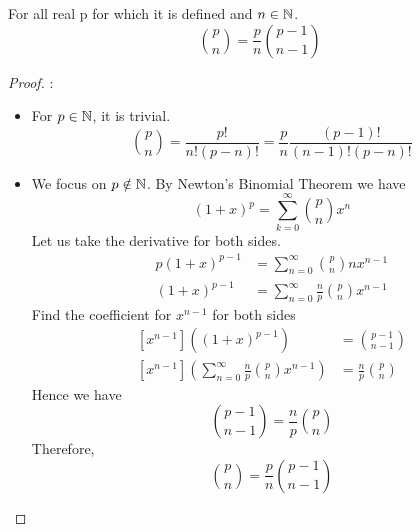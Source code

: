 \begin{lemma}
    For all real p for which it is defined and $n \in \mathbb{N}$.
    $${p \choose n}=\frac{p}{n}{p-1 \choose n-1}$$
\end{lemma}
\begin{proof}:
    \begin{itemize}
        \item For $p \in \mathbb{N}$, it is trivial. $${p \choose n}=\frac{p!}{n!(p-n)!}=\frac{p}{n}\frac{(p-1)!}{(n-1)!(p-n)!}$$
        \item We focus on $p \notin \mathbb{N}$. By Newton's Binomial Theorem we have $$(1+x)^p=\sum_{k=0}^{\infty}{p \choose n}x^n$$
        Let us take the derivative for both sides.
        \begin{equation}
            \begin{split}
                p(1+x)^{p-1} &= \sum_{n=0}^{\infty}{p \choose n}nx^{n-1}\\
                (1+x)^{p-1} &= \sum_{n=0}^{\infty}\frac{n}{p}{p \choose n}x^{n-1}
            \end{split}
        \end{equation}
        Find the coefficient for $x^{n-1}$ for both sides
        \begin{equation}
            \begin{split}
                [x^{n-1}]((1+x)^{p-1}) &= {p-1 \choose n-1}\\
                [x^{n-1}](\sum_{n=0}^{\infty}\frac{n}{p}{p \choose n}x^{n-1}) &= \frac{n}{p}{p \choose n}
            \end{split}
        \end{equation}
        Hence we have $${p-1 \choose n-1}= \frac{n}{p}{p \choose n}$$
        Therefore, $${p \choose n}= \frac{p}{n}{p-1 \choose n-1}$$
    \end{itemize}
\end{proof}

